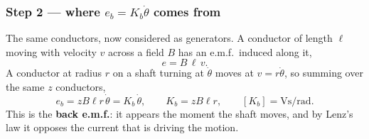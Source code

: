 \documentclass[11pt,a4paper]{article}
\begin{document}
\subsubsection{Step 2 --- where $e_{b}=K_{b}\dot\theta$ comes from}
\label{sss:emfconst}

The same conductors, now considered as generators. A conductor of length
$\ell$ moving with velocity $v$ across a field $B$ has an e.m.f.\ induced
along it,
\[
  e=B\,\ell\,v .
\]
A conductor at radius $r$ on a shaft turning at $\dot\theta$ moves at
$v=r\dot\theta$, so summing over the same $z$ conductors,
\begin{equation}
  e_{b}=z B\ell r\,\dot\theta=K_{b}\,\dot\theta,
  \qquad K_{b}=z B\ell r,
  \qquad [K_{b}]=\si{\volt\second\per\radian}.
  \label{eq:emfconst}
\end{equation}
This is the \textbf{back e.m.f.}: it appears the moment the shaft moves, and by
Lenz's law it opposes the current that is driving the motion.
\end{document}

